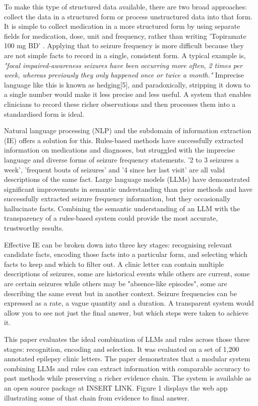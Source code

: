 \documentclass[conference]{IEEEtran}
\begin{document}
To make this type of structured data available, there are
two broad approaches: collect the data in a structured 
form or process unstructured data into that form. It is 
simple to collect medication in a more structured form by 
using separate fields for medication, dose, unit and 
frequency, rather than writing 'Topiramate 100 mg BD' . 
Applying that to seizure frequency is more difficult 
because they are not simple facts to record in a single,
consistent form. A typical example is, \emph{"focal 
impaired-awareness seizures have been occurring 
more often, 2 times per week, whereas previously 
they only happened once or twice a month."} 
Imprecise language like this is known as hedging[5], 
and paradoxically, stripping it down to a single number 
would make it less precise and less useful. A system 
that enables clinicians to record these richer 
observations and then processes them into a 
standardised form is ideal.

Natural language processing (NLP) and the subdomain
of information extraction (IE) offers a solution for this. 
Rules-based methods have successfully extracted
information on medications and diagnoses, but struggled
with the imprecise language and diverse forms
of seizure frequency statements. '2 to 3 seizures a week', 
'frequent bouts of seizures' and '4 since her last visit' are
all valid descriptions of the same fact. Large language 
models (LLMs) have demonstrated significant 
improvements in semantic understanding than prior 
methods and have successfully extracted seizure 
frequency information, but they occasionally hallucinate
facts. Combining the semantic understanding of an LLM
with the transparency of a rules-based system could
provide the most accurate, trustworthy results.

Effective IE can be broken down into three key stages: 
recognising relevant candidate facts, encoding those facts 
into a particular form, and selecting which facts to keep 
and which to filter out. A clinic letter can contain multiple 
descriptions of seizures, some are historical events while 
others are current, some are certain seizures while others 
may be "absence-like episodes", some are describing the 
same event but in another context. Seizure frequencies 
can be expressed as a rate, a vague quantity and a 
duration. A transparent system would allow you to see not 
just the final answer, but which steps were taken to achieve 
it.

This paper evaluates the ideal combination of LLMs and 
rules across those three stages: recognition, encoding and 
selection. It was evaluated on a set of 1,200 annotated 
epilepsy clinic letters. The paper demonstrates that a 
modular system combining LLMs and rules can extract 
information with comparable accuracy to past methods 
while preserving a richer evidence chain. The system 
is available as an open source package at INSERT LINK.
Figure 1 displays the web app illustrating some of that 
chain from evidence to final answer.
\end{document}
